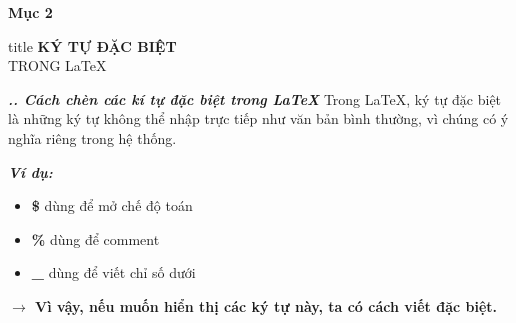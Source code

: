 \documentclass[11pt]{beamer}
\newcounter{group}
\newcommand{\slidenum}{\thegroup.\thesubslide}
\newcounter{subslide}
\begin{document}
	\begin{frame}{\textbf{Mục 2}}\label{Mục 2}
		\centering
		
		\vspace{1cm}
		
		\begin{beamercolorbox}[rounded=true,shadow=true,sep=1em]{title}
			\centering
			{\Huge \textbf{\MakeUppercase{ký tự đặc biệt}}}\\[0.3cm]
			{\Large \MakeUppercase{trong} \LaTeX}
		\end{beamercolorbox}
		
		\vspace{1cm}
	\end{frame}
	\setcounter{group}{2}
	\begin{frame}[fragile]{\textbf{\textit{\textit{\slidenum. Cách chèn các kí tự đặc biệt trong \LaTeX}}}}
		\large Trong \LaTeX, ký tự đặc biệt là những ký tự không thể nhập trực tiếp như văn bản bình thường, vì chúng có ý nghĩa riêng trong hệ thống.
		\begin{block}{\textbf{\textit{Ví dụ:}}}
			\begin{itemize}
				\item \textbf{\$} dùng để mở chế độ toán
				\item \textbf{\%} dùng để comment
				\item \textbf{\_} dùng để viết chỉ số dưới
			\end{itemize}
			\textbf{$\to$ Vì vậy, nếu muốn hiển thị các ký tự này, ta có cách viết đặc biệt.}
		\end{block}
	\end{frame}
\end{document}
